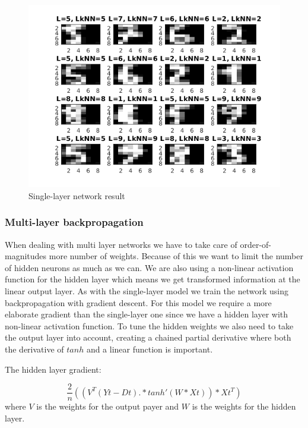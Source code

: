 \documentclass[a4paper,12pt]{article}
\begin{document}
\begin{figure}[H]
\centering
  \begin{minipage}[]{1\textwidth}
  \caption{Single-layer network result}\label{fig:single_4_test}
  \includegraphics[width=\textwidth]{figures/single_4_test.png}
  \end{minipage}
\end{figure}


\subsubsection{Multi-layer backpropagation}

When dealing with multi layer networks we have to take care of order-of-magnitudes more number of weights. Because of this we want to limit the number of hidden neurons as much as we can. We are also using a non-linear activation function for the hidden layer which means we get transformed information at the linear output layer. As with the single-layer model we train the network using backpropagation with gradient descent. For this model we require a more elaborate gradient than the single-layer one since we have a hidden layer with non-linear activation function. To tune the hidden weights we also need to take the output layer into account, creating a chained partial derivative where both the derivative of $tanh$ and a linear function is important.

The hidden layer gradient:

\begin{equation}
\frac{2}{n}((V^T(Yt - Dt).*tanh'(W*Xt))*Xt^T)
\end{equation}
where $V$ is the weights for the output payer and $W$ is the weights for the hidden layer.
\end{document}
